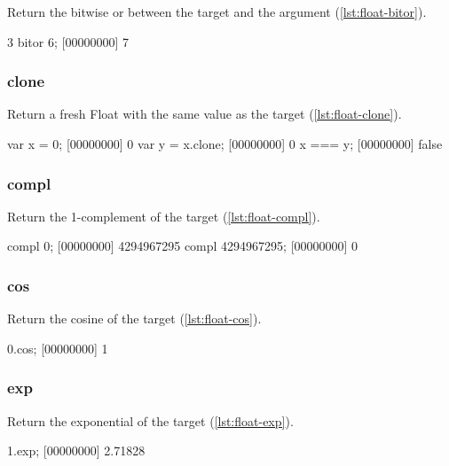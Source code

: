 Return the bitwise or between the target and the argument
(\autoref{lst:float-bitor}).

\begin{urbiscript}[caption=Float.bitor, label=lst:float-bitor]
3 bitor 6;
[00000000] 7
\end{urbiscript}

\subsubsection{clone}

Return a fresh Float with the same value as the target
(\autoref{lst:float-clone}).

\begin{urbiscript}[caption=Float.clone, label=lst:float-clone]
var x = 0;
[00000000] 0
var y = x.clone;
[00000000] 0
x === y;
[00000000] false
\end{urbiscript}

\subsubsection{compl}

Return the 1-complement of the target (\autoref{lst:float-compl}).

\begin{urbiscript}[caption=Float.compl, label=lst:float-compl]
compl 0;
[00000000] 4294967295
compl 4294967295;
[00000000] 0
\end{urbiscript}

\subsubsection{cos}

Return the cosine of the target (\autoref{lst:float-cos}).

\begin{urbiscript}[caption=Float.cos, label=lst:float-cos]
0.cos;
[00000000] 1
\end{urbiscript}

\subsubsection{exp}

Return the exponential of the target (\autoref{lst:float-exp}).

\begin{urbiscript}[caption=Float.exp, label=lst:float-exp]
1.exp;
[00000000] 2.71828
\end{urbiscript}

